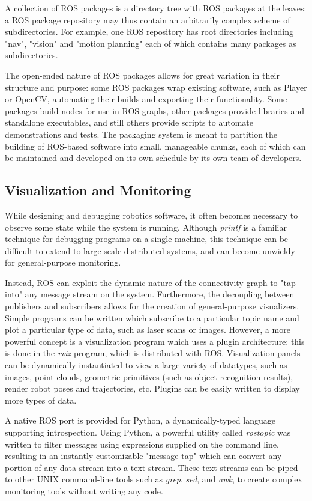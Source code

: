 A collection of ROS packages is a directory tree with ROS packages at the leaves: a ROS package repository may thus contain an arbitrarily complex scheme of subdirectories. For example, one ROS repository has root directories including "nav", "vision" and "motion planning" each of which contains many packages as subdirectories.

The open-ended nature of ROS packages allows for great variation in their structure and purpose: some ROS packages wrap existing software, such as Player or OpenCV, automating their builds and exporting their functionality. Some packages build nodes for use in ROS graphs, other packages provide libraries and standalone executables, and still others provide scripts to automate demonstrations and tests. The packaging system is meant to partition the building of ROS-based software into small, manageable chunks, each of which can be maintained and developed on its own schedule by its own team of developers.

\subsection{Visualization and Monitoring}

While designing and debugging robotics software, it often becomes necessary to observe some state while the system is running. Although \textit{printf} is a familiar technique for debugging programs on a single machine, this technique can be difficult to extend to large-scale distributed systems, and can become unwieldy for general-purpose monitoring.

Instead, ROS can exploit the dynamic nature of the connectivity graph to "tap into" any message stream on the system. Furthermore, the decoupling between publishers and subscribers allows for the creation of general-purpose visualizers. Simple programs can be written which subscribe to a particular topic name and plot a particular type of data, such as laser scans or images. However, a more powerful concept is a visualization program which uses a plugin architecture: this is done in the \textit{rviz} program, which is distributed with ROS. Visualization panels can be dynamically instantiated to view a large variety of datatypes, such as images, point clouds, geometric primitives (such as object recognition results), render robot poses and trajectories, etc. Plugins can be easily written to display more types of data.

A native ROS port is provided for Python, a dynamically-typed language supporting introspection. Using Python, a powerful utility called \textit{rostopic} was written to filter messages using expressions supplied on the command line, resulting in an instantly customizable "message tap" which can convert any portion of any data stream into a text stream. These text streams can be piped to other UNIX command-line tools such as \textit{grep}, \textit{sed}, and \textit{awk}, to create complex monitoring tools without writing any code.

